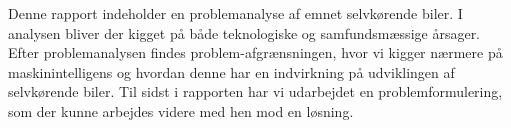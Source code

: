 Denne rapport indeholder en problemanalyse af emnet selvkørende biler. I analysen bliver der kigget på både teknologiske og samfundsmæssige årsager. Efter problemanalysen findes problem-afgrænsningen, hvor vi kigger nærmere på maskinintelligens og hvordan denne har en indvirkning på udviklingen af selvkørende biler. Til sidst i rapporten har vi udarbejdet en problemformulering, som der kunne arbejdes videre med hen mod en løsning.